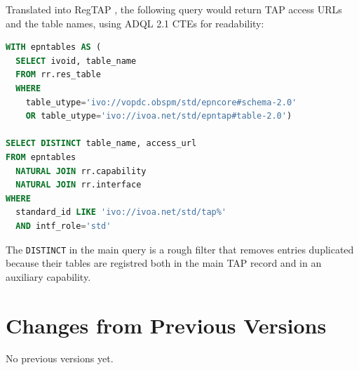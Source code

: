 \documentclass[11pt,a4paper]{ivoa}
\begin{document}
Translated into RegTAP \citep{2019ivoa.spec.1011D}, the following query
would return TAP access URLs and the table names, using ADQL 2.1 CTEs
for readability:

\begin{lstlisting}[language=SQL]
WITH epntables AS (
  SELECT ivoid, table_name
  FROM rr.res_table
  WHERE
    table_utype='ivo://vopdc.obspm/std/epncore#schema-2.0'
    OR table_utype='ivo://ivoa.net/std/epntap#table-2.0')

SELECT DISTINCT table_name, access_url
FROM epntables
  NATURAL JOIN rr.capability
  NATURAL JOIN rr.interface
WHERE
  standard_id LIKE 'ivo://ivoa.net/std/tap%'
  AND intf_role='std'
\end{lstlisting}

The \texttt{DISTINCT} in the main query is a rough filter that removes
entries duplicated because their tables are registred both in the main
TAP record and in an auxiliary capability.

\appendix
\section{Changes from Previous Versions}

No previous versions yet.  



\end{document}
